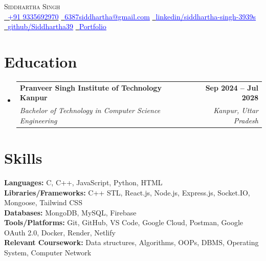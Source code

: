 \documentclass[letterpaper,11pt]{article}
\makeatletter
\newcommand{\resumeSubheading}[4]{
  \vspace{-2pt}\item
    \begin{tabular*}{1.0\textwidth}[t]{l@{\extracolsep{\fill}}r}
      \textbf{#1} & \textbf{\small #2} \\
      \textit{\small#3} & \textit{\small #4} \\
    \end{tabular*}\vspace{-7pt}
}
\newcommand{\resumeSubHeadingListStart}{\begin{itemize}[leftmargin=0.0in, label={}]}
\newcommand{\resumeSubHeadingListEnd}{\end{itemize}}
\makeatother
\begin{document}
\begin{center}
{\Huge \scshape Siddhartha Singh} \\[3pt]

{\small
\href{tel:+916387598633}{\textcolor{Blue}{\faPhone~+91 9335692970}} \quad
\href{mailto:6387siddhartha@gmail.com}{\textcolor{Blue}{\faEnvelope~\underline{6387siddhartha@gmail.com}}} \quad
\href{https://www.linkedin.com/in/siddhartha-singh-3939s}{\textcolor{Blue}{\faLinkedin~\underline{linkedin/siddhartha-singh-3939s}}} \quad
\href{https://github.com/Siddhartha39}{\textcolor{Blue}{\faGithub~\underline{github/Siddhartha39}}} \quad
\href{https://siddharthaportfolio3939.vercel.app/}{\textcolor{Blue}{\faGlobe~\underline{Portfolio}}}
}
\end{center}

\section{Education}
  \resumeSubHeadingListStart
    \resumeSubheading
      {Pranveer Singh Institute of Technology Kanpur}{Sep 2024 -- Jul 2028}
      {Bachelor of Technology in Computer Science Engineering}{Kanpur, Uttar Pradesh}
  
  \resumeSubHeadingListEnd
  \vspace{-13pt}
  
\vspace{2pt}
\section{Skills}
 \begin{itemize}[leftmargin=0.15in, label={}] 
    \small{\item{
     \textbf{Languages: }{C, C++, JavaScript, Python, HTML} \\
     \textbf{Libraries/Frameworks: }{C++ STL, React.js, Node.js, Express.js, Socket.IO, Mongoose, Tailwind CSS} \\
     \textbf{Databases: }{MongoDB, MySQL, Firebase} \\
     \textbf{Tools/Platforms: }{Git, GitHub, VS Code, Google Cloud, Postman, Google OAuth 2.0, Docker, Render, Netlify} \\
     \textbf{Relevant Coursework: }{Data structures, Algorithms, OOPs, DBMS, Operating System, Computer Network}
    }}
 \end{itemize}
 \vspace{-16pt}
\end{document}
